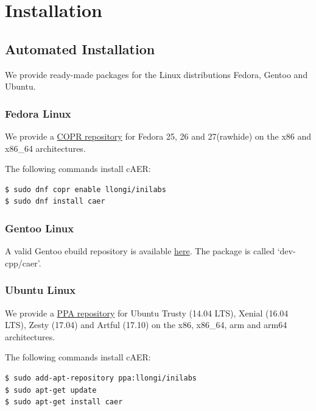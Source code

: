 \documentclass[a4paper,12pt]{report}
\begin{document}
\chapter{Installation} \label{chap:installation}

\section{Automated Installation} \label{sec:automated_installation}

We provide ready-made packages for the Linux distributions Fedora, Gentoo and Ubuntu.

\subsection{Fedora Linux} \label{subsec:fedora_linux}

We provide a \href{https://copr.fedorainfracloud.org/coprs/llongi/inilabs/}{COPR repository} for Fedora 25, 26 and 27(rawhide) on the x86 and x86\_64 architectures.

The following commands install cAER:

\begin{lstlisting}
$ sudo dnf copr enable llongi/inilabs
$ sudo dnf install caer
\end{lstlisting}

\subsection{Gentoo Linux} \label{subsec:gentoo_linux}

A valid Gentoo ebuild repository is available \href{https://github.com/inilabs/caer/tree/master/packaging/gentoo-ebuild-repository/}{here}. The package is called ‘dev-cpp/caer’.

\subsection{Ubuntu Linux} \label{subsec:ubuntu_linux}

We provide a \href{https://launchpad.net/~llongi/+archive/ubuntu/inilabs/}{PPA repository} for Ubuntu Trusty (14.04 LTS), Xenial (16.04 LTS), Zesty (17.04) and Artful (17.10) on the x86, x86\_64, arm and arm64 architectures.

The following commands install cAER:

\begin{lstlisting}
$ sudo add-apt-repository ppa:llongi/inilabs
$ sudo apt-get update
$ sudo apt-get install caer
\end{lstlisting}
\end{document}
